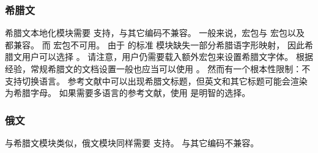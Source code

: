 \subsubsection{希腊文}%
\label{use:loc:grk}


希腊文本地化模块需要 \utf 支持，与其它编码不兼容。
一般来说，\biblatex 宏包与  宏包以及 \XeLaTeX 都兼容。
而  宏包不可用。
由于  的标准  模块缺失一部分希腊语字形映射，
因此希腊文用户可以选择 \XeLaTeX 。
请注意，用户仍需要载入额外宏包来设置希腊文字体。
根据经验，常规希腊文的文档设置一般也应当可以使用 \biblatex 。
然而有一个根本性限制：\biblatex 不支持切换语言。
参考文献中可以出现希腊文标题，但英文和其它标题可能会渲染为希腊字母。
如果需要多语言的参考文献，使用 \XeLaTeX 是明智的选择。

\subsubsection{俄文}%
\label{use:loc:rus}


与希腊文模块类似，俄文模块同样需要 \utf 支持。
与其它编码不兼容。


